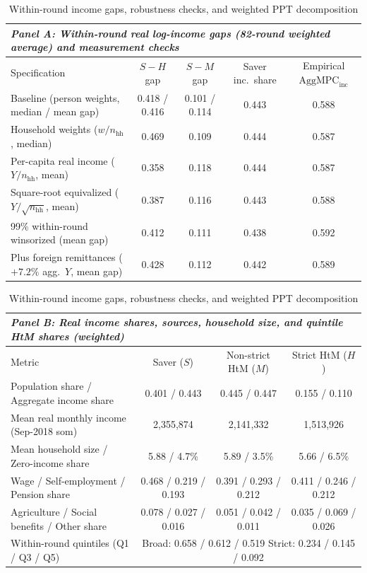 \documentclass[11pt]{article}
\begin{document}
\begin{table}[tbp]
\centering
\caption{Within-round income gaps, robustness checks, and weighted PPT decomposition}
\label{tab:income}
\scriptsize
\setlength{\tabcolsep}{3.2pt}
\begin{tabular}{lcccc}
\toprule
\multicolumn{5}{l}{\textit{Panel A: Within-round real log-income gaps (82-round weighted average) and measurement checks}} \\
\midrule
Specification & $S - H$ gap & $S - M$ gap & Saver inc.\ share & Empirical $\text{AggMPC}_{\text{inc}}$ \\
\midrule
Baseline (person weights, median / mean gap) & 0.418 / 0.416 & 0.101 / 0.114 & 0.443 & 0.588 \\
Household weights ($w / n_{\text{hh}}$, median) & 0.469 & 0.109 & 0.444 & 0.587 \\
Per-capita real income ($Y / n_{\text{hh}}$, mean) & 0.358 & 0.118 & 0.444 & 0.587 \\
Square-root equivalized ($Y / \sqrt{n_{\text{hh}}}$, mean) & 0.387 & 0.116 & 0.443 & 0.588 \\
99\% within-round winsorized (mean gap) & 0.412 & 0.111 & 0.438 & 0.592 \\
Plus foreign remittances ($+7.2\%$ agg.\ $Y$, mean gap) & 0.428 & 0.112 & 0.442 & 0.589 \\
\bottomrule
\end{tabular}

\medskip
\begin{tabular}{lccc}
\toprule
\multicolumn{4}{l}{\textit{Panel B: Real income shares, sources, household size, and quintile HtM shares (weighted)}} \\
\midrule
Metric & Saver ($S$) & Non-strict HtM ($M$) & Strict HtM ($H$) \\
\midrule
Population share / Aggregate income share & 0.401 / 0.443 & 0.445 / 0.447 & 0.155 / 0.110 \\
Mean real monthly income (Sep-2018 som) & 2,355,874 & 2,141,332 & 1,513,926 \\
Mean household size / Zero-income share & 5.88 / 4.7\% & 5.89 / 3.5\% & 5.66 / 6.5\% \\
Wage / Self-employment / Pension share & 0.468 / 0.219 / 0.193 & 0.391 / 0.293 / 0.212 & 0.411 / 0.246 / 0.212 \\
Agriculture / Social benefits / Other share & 0.078 / 0.027 / 0.016 & 0.051 / 0.042 / 0.011 & 0.035 / 0.069 / 0.026 \\
Within-round quintiles (Q1 / Q3 / Q5) & \multicolumn{3}{c}{Broad: 0.658 / 0.612 / 0.519 \quad Strict: 0.234 / 0.145 / 0.092} \\
\bottomrule
\end{tabular}


\end{table}
\end{document}
